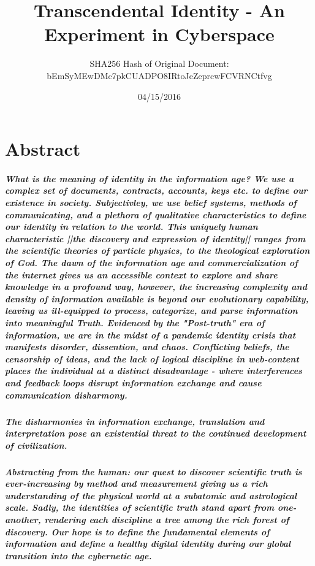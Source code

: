 \documentclass{article}
\title{Transcendental Identity - An Experiment in Cyberspace}
\date{04/15/2016}
\author{SHA256 Hash of Original Document:\\ bEmSyMEwDMc7pkCUADPO8IRtoJeZeprcwFCVRNCtfvg }
\begin{document}
	\maketitle
	\newpage

	\tableofcontents
	\newpage
\section{Abstract}
	\subparagraph{What is the meaning of identity in the information age?  We use a complex set of documents, contracts, accounts, keys etc. to define our existence in society.  Subjectivley, we use belief systems, methods of communicating, and a plethora of qualitative characteristics to define our identity in relation to the world.  This uniquely human characteristic ||the discovery and expression of identity|| ranges from the scientific theories of particle physics, to the theological exploration of God.  The dawn of the information age and commercialization of the internet gives us an accessible context to explore and share knowledge in a profound way, however, the increasing complexity and density of information available is beyond our evolutionary capability, leaving us ill-equipped to process, categorize, and parse information into meaningful Truth.  Evidenced by the "Post-truth" era of information, we are in the midst of a pandemic identity crisis that manifests disorder, dissention, and chaos.  Conflicting beliefs, the censorship of ideas, and the lack of logical discipline in web-content places the individual at a distinct disadvantage - where interferences and feedback loops disrupt information exchange and cause communication disharmony.}  
\subparagraph{The disharmonies in information exchange, translation and interpretation pose an existential threat to the continued development of civilization.}
\subparagraph{Abstracting from the human: our quest to discover scientific truth is ever-increasing by method and measurement giving us a rich understanding of the physical world at a subatomic and astrological scale.  Sadly, the identities of scientific truth stand apart from one-another, rendering each discipline a tree among the rich forest of discovery.  Our hope is to define the fundamental elements of information and define a healthy digital identity during our global transition into the cybernetic age.}
 
\end{document}

